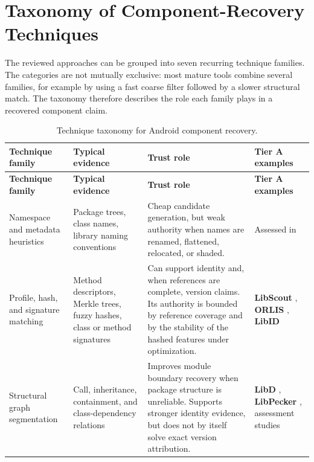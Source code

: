\section{Taxonomy of Component-Recovery Techniques}

The reviewed approaches can be grouped into seven recurring technique
families. The categories are not mutually exclusive: most mature tools combine
several families, for example by using a fast coarse filter followed by a
slower structural match. The taxonomy therefore describes the role each
family plays in a recovered component claim.

\begingroup
\small
\renewcommand{\arraystretch}{1.15}
\begin{longtable}{p{}p{}p{}p{}}
\caption{Technique taxonomy for Android component recovery.}
\label{tab:master-technique-taxonomy}\\
\toprule
\textbf{Technique family} & \textbf{Typical evidence} & \textbf{Trust role} & \textbf{Tier A examples}\\
\midrule
\endfirsthead
\toprule
\textbf{Technique family} & \textbf{Typical evidence} & \textbf{Trust role} & \textbf{Tier A examples}\\
\midrule
\endhead
\bottomrule
\endfoot
Namespace and metadata heuristics &
Package trees, class names, library naming conventions &
Cheap candidate generation, but weak authority when names are renamed,
flattened, relocated, or shaded. &
Assessed in \cite{zhan2020assessment,zhan2021systematic}\\

Profile, hash, and signature matching &
Method descriptors, Merkle trees, fuzzy hashes, class or method signatures &
Can support identity and, when references are complete, version claims. Its
authority is bounded by reference coverage and by the stability of the hashed
features under optimization. &
\textbf{LibScout} \cite{backes2016libscout}, \textbf{ORLIS} \cite{wang2018orlis}, \textbf{LibID}
\cite{zhang2019libid}\\

Structural graph segmentation &
Call, inheritance, containment, and class-dependency relations &
Improves module boundary recovery when package structure is unreliable.
Supports stronger identity evidence, but does not by itself solve exact
version attribution. &
\textbf{LibD} \cite{li2017libd}, \textbf{LibPecker} \cite{zhang2018libpecker}, assessment
studies \cite{zhan2020assessment,zhan2021systematic}\\


\end{longtable}
